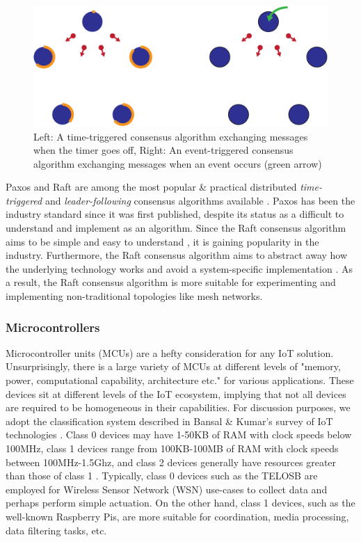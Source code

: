 \begin{figure}[H]
    \centering
    \includegraphics[width=0.55\columnwidth]{images/consensus_time_based_and_evevent_based.png}
    \caption{Left: A time-triggered consensus algorithm exchanging messages when the timer goes off, Right: An event-triggered consensus algorithm exchanging messages when an event occurs (green arrow)}
    \label{fig:consensus_time_based_and_evevent_based}
\end{figure}

Paxos and Raft are among the most popular \& practical distributed \emph{time-triggered} and \emph{leader-following} consensus algorithms available \cite{paxos_vs_raft}. Paxos has been the industry standard since it was first published, despite its status as a difficult to understand and implement as an algorithm. Since the Raft consensus algorithm aims to be simple and easy to understand \cite{raft_paper}, it is gaining popularity in the industry. Furthermore, the Raft consensus algorithm aims to abstract away how the underlying technology works and avoid a system-specific implementation \cite{paxos_vs_raft}. As a result, the Raft consensus algorithm is more suitable for experimenting and implementing non-traditional topologies like mesh networks.

\subsubsection{Microcontrollers}
Microcontroller units (MCUs) are a hefty consideration for any IoT solution. Unsurprisingly, there is a large variety of MCUs at different levels of "memory, power, computational capability, architecture etc." \cite{bansal2020iotsurveydevices} for various applications. These devices sit at different levels of the IoT ecosystem, implying that not all devices are required to be homogeneous in their capabilities. For discussion purposes, we adopt the classification system described in Bansal & Kumar's survey of IoT technologies \cite{bansal2020iotsurveydevices}. Class 0 devices may have 1-50KB of RAM with clock speeds below 100MHz, class 1 devices range from 100KB-100MB of RAM with clock speeds between 100MHz-1.5Ghz, and class 2 devices generally have resources greater than those of class 1 \cite{bansal2020iotsurveydevices}. Typically, class 0 devices such as the TELOSB are employed for Wireless Sensor Network (WSN) use-cases to collect data and perhaps perform simple actuation. On the other hand, class 1 devices, such as the well-known Raspberry Pis, are more suitable for coordination, media processing, data filtering tasks, etc.

